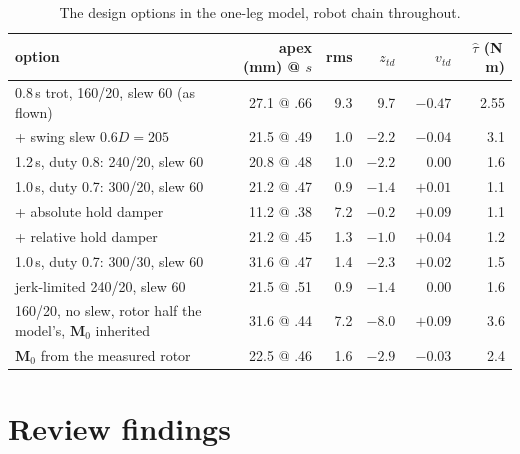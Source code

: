\documentclass[11pt,a4paper]{article}
\newcommand{\Mmat}{\mathbf{M}}
\begin{document}
\begin{table}[htbp]
\centering
\caption{The design options in the one-leg model, robot chain throughout.}
\label{tab:options}
\small
\begin{tabular}{@{}lrrrrr@{}}
\toprule
option & apex (mm) @ $s$ & rms & $z_{td}$ & $v_{td}$ & $\hat\tau$ (N\,m) \\
\midrule
0.8\,s trot, 160/20, slew 60 (as flown)        & 27.1 @ .66 & 9.3 & 9.7 & $-0.47$ & 2.55 \\
\quad + swing slew $0.6D = 205$                & 21.5 @ .49 & 1.0 & $-2.2$ & $-0.04$ & 3.1 \\
1.2\,s, duty 0.8: 240/20, slew 60               & 20.8 @ .48 & 1.0 & $-2.2$ & $\phantom{-}0.00$ & 1.6 \\
1.0\,s, duty 0.7: 300/20, slew 60               & 21.2 @ .47 & 0.9 & $-1.4$ & $+0.01$ & 1.1 \\
\quad + absolute hold damper                    & \textcolor{bad}{11.2 @ .38} & 7.2 & $-0.2$ & $+0.09$ & 1.1 \\
\quad + relative hold damper                    & 21.2 @ .45 & 1.3 & $-1.0$ & $+0.04$ & 1.2 \\
1.0\,s, duty 0.7: 300/30, slew 60               & 31.6 @ .47 & 1.4 & $-2.3$ & $+0.02$ & 1.5 \\
jerk-limited 240/20, slew 60                    & 21.5 @ .51 & 0.9 & $-1.4$ & $\phantom{-}0.00$ & 1.6 \\
\midrule
160/20, no slew, rotor half the model's, $\Mmat_0$ inherited & \textcolor{bad}{31.6 @ .44} & 7.2 & $-8.0$ & $+0.09$ & 3.6 \\
\quad $\Mmat_0$ from the measured rotor          & 22.5 @ .46 & 1.6 & $-2.9$ & $-0.03$ & 2.4 \\
\bottomrule
\end{tabular}
\end{table}

\section{Review findings}
\label{sec:review}
\end{document}
